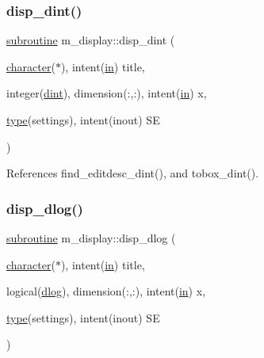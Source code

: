 \subsubsection{\texorpdfstring{disp\+\_\+dint()}{disp\_dint()}}
{\footnotesize\ttfamily \hyperlink{M__stopwatch_83_8txt_acfbcff50169d691ff02d4a123ed70482}{subroutine} m\+\_\+display\+::disp\+\_\+dint (\begin{DoxyParamCaption}\item[{\hyperlink{option__stopwatch_83_8txt_abd4b21fbbd175834027b5224bfe97e66}{character}($\ast$), intent(\hyperlink{M__journal_83_8txt_afce72651d1eed785a2132bee863b2f38}{in})}]{title,  }\item[{integer(\hyperlink{namespacem__display_a73f772e9702cad6f40b78364fde2c7cd}{dint}), dimension(\+:,\+:), intent(\hyperlink{M__journal_83_8txt_afce72651d1eed785a2132bee863b2f38}{in})}]{x,  }\item[{\hyperlink{stop__watch_83_8txt_a70f0ead91c32e25323c03265aa302c1c}{type}(settings), intent(inout)}]{SE }\end{DoxyParamCaption})\hspace{0.3cm}{\ttfamily [private]}}



References find\+\_\+editdesc\+\_\+dint(), and tobox\+\_\+dint().

\mbox{\label{namespacem__display_ac6960db2f07da55b2c8a72f30531ed97}} 
\subsubsection{\texorpdfstring{disp\+\_\+dlog()}{disp\_dlog()}}
{\footnotesize\ttfamily \hyperlink{M__stopwatch_83_8txt_acfbcff50169d691ff02d4a123ed70482}{subroutine} m\+\_\+display\+::disp\+\_\+dlog (\begin{DoxyParamCaption}\item[{\hyperlink{option__stopwatch_83_8txt_abd4b21fbbd175834027b5224bfe97e66}{character}($\ast$), intent(\hyperlink{M__journal_83_8txt_afce72651d1eed785a2132bee863b2f38}{in})}]{title,  }\item[{logical(\hyperlink{namespacem__display_a8c6a3df510feabf6bc84dd0a8789f98c}{dlog}), dimension(\+:,\+:), intent(\hyperlink{M__journal_83_8txt_afce72651d1eed785a2132bee863b2f38}{in})}]{x,  }\item[{\hyperlink{stop__watch_83_8txt_a70f0ead91c32e25323c03265aa302c1c}{type}(settings), intent(inout)}]{SE }\end{DoxyParamCaption})\hspace{0.3cm}{\ttfamily [private]}}



